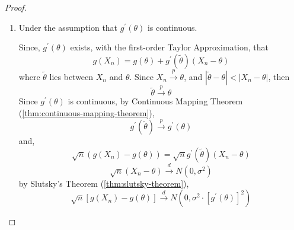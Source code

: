 \begin{proof}
	\begin{enumerate}
		\item  Under the assumption that $g^{\prime}(\theta)$ is continuous.

		      Since, $g^{\prime}(\theta)$ exists, with the first-order Taylor Approximation, that
		      \begin{equation*}
			      g(X_n)=g(\theta)+g^{\prime}(\tilde{\theta})(X_n-\theta)
		      \end{equation*}
		      where $\tilde{\theta}$ lies between $X_n$ and $\theta$.
		      Since $X_n\stackrel{p}{\rightarrow}\theta$, and $|\tilde{\theta}-\theta|<|X_n-\theta|$, then
		      \begin{equation*}
			      \tilde{\theta}\stackrel{p}{\rightarrow}\theta
		      \end{equation*}
		      Since $g^{\prime}(\theta)$ is continuous, by Continuous Mapping Theorem (\ref{thm:continuous-mapping-theorem}),
		      \begin{equation*}
			      g^{\prime}(\tilde{\theta})\stackrel{p}{\rightarrow}g^{\prime}(\theta)
		      \end{equation*}
		      and,
		      \begin{equation*}
			      \sqrt{n}\left(g(X_n)-g(\theta)\right)=\sqrt{n}g^{\prime}(\tilde{\theta})(X_n-\theta)
		      \end{equation*}
		      \begin{equation*}
			      \sqrt{n}\left(X_{n}-\theta\right)\stackrel{d}{\rightarrow}N\left(0,\sigma^{2}\right)
		      \end{equation*}
		      by Slutsky's Theorem (\ref{thm:slutsky-theorem}),
		      \begin{equation*}
			      \sqrt{n}\left[g\left(X_{n}\right)-g(\theta)\right] \stackrel{d}{\rightarrow}N\left(0,\sigma^{2}\cdot\left[g^{\prime}(\theta)\right]^{2}\right)
		      \end{equation*}
	\end{enumerate}
\end{proof}

\begin{theorem}

\end{theorem}

